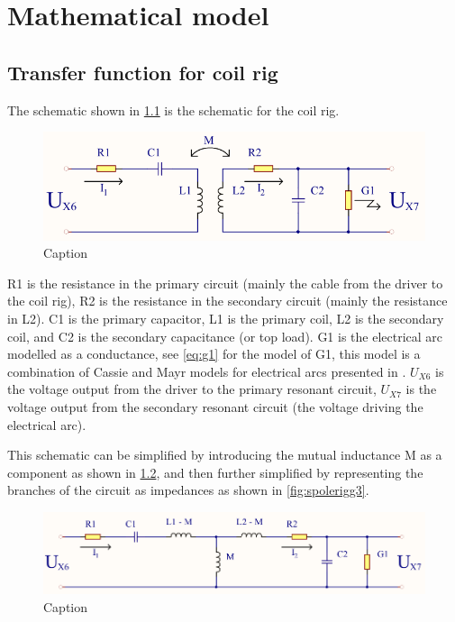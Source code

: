 \chapter{Mathematical model}
\label{sec:math}


\section{Transfer function for coil rig}

The schematic shown in \cref{fig:spolerigg11} is the schematic for the coil rig.

\begin{figure}[h!]
    \centering
    \includegraphics[width=\textwidth]{Skjema/Spolerigg1_r.pdf}
    \caption{Caption}
    \label{fig:spolerigg11}
\end{figure}

R1 is the resistance in the primary circuit (mainly the cable from the driver to the coil rig), R2 is the resistance in the secondary circuit (mainly the resistance in L2). C1 is the primary capacitor, L1 is the primary coil, L2 is the secondary coil, and C2 is the secondary capacitance (or top load). G1 is the electrical arc modelled as a conductance, see \cref{eq:g1} for the model of G1, this model is a combination of Cassie \citep{cassie} and Mayr \citep{mayr} models for electrical arcs presented in \citep{575670}. $U_{X6}$ is the voltage output from the driver to the primary resonant circuit, $U_{X7}$ is the voltage output from the secondary resonant circuit (the voltage driving the electrical arc).

This schematic can be simplified by introducing the mutual inductance M as a component as shown in \cref{fig:spolerigg2}, and then further simplified by representing the branches of the circuit as impedances as shown in \cref{fig:spolerigg3}.

\begin{figure}[h!]
    \centering
    \includegraphics[width=\textwidth]{Skjema/Spolerigg2_r.pdf}
    \caption{Caption}
    \label{fig:spolerigg2}
\end{figure}

